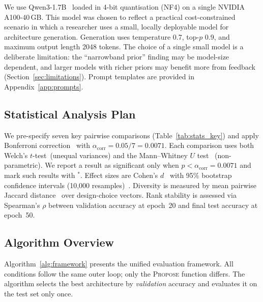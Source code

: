 \documentclass[10pt]{article}
\begin{document}
We use Qwen3-1.7B~\citep{qwen2025qwen3} loaded in 4-bit quantisation (NF4) on a
single NVIDIA A100-40\,GB.  This model was chosen to reflect a practical
cost-constrained scenario in which a researcher uses a small, locally deployable
model for architecture generation.  Generation uses temperature 0.7, top-$p$
0.9, and maximum output length 2048 tokens.  The choice of a single small model
is a deliberate limitation: the ``narrowband prior'' finding may be
model-size dependent, and larger models with richer priors may benefit more from
feedback (Section~\ref{sec:limitations}).  Prompt templates are provided in
Appendix~\ref{app:prompts}.

\subsection{Statistical Analysis Plan}
\label{sec:stats}

We pre-specify seven key pairwise comparisons (Table~\ref{tab:stats_key}) and
apply Bonferroni correction~\citep{bonferroni1936teoria} with
$\alpha_{\mathrm{corr}}{=}0.05/7{=}0.0071$.  Each comparison uses both Welch's
$t$-test~(unequal variances) and the Mann--Whitney $U$
test~\citep{mann1947test} (non-parametric).  We report a result as significant
only when $p{<}\alpha_{\mathrm{corr}}{=}0.0071$ and mark such results with
$^*$.  Effect sizes are Cohen's $d$~\citep{cohen1988statistical} with 95\%
bootstrap confidence intervals (10,000
resamples)~\citep{efron1993bootstrap}.  Diversity is measured by mean pairwise
Jaccard distance~\citep{jaccard1912distribution} over design-choice vectors.
Rank stability is assessed via Spearman's $\rho$ between validation accuracy at
epoch~20 and final test accuracy at epoch~50.

\subsection{Algorithm Overview}
\label{sec:algorithm}

Algorithm~\ref{alg:framework} presents the unified evaluation framework.
All conditions follow the same outer loop; only the \textsc{Propose} function
differs.  The algorithm selects the best architecture by
\emph{validation} accuracy and evaluates it on the test set only once.
\end{document}
